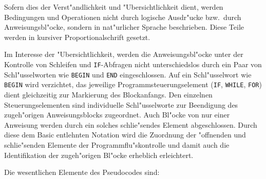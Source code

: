 Sofern dies der Verst"andlichkeit und "Ubersichtlichkeit
dient, werden Bedingungen und Operationen nicht durch logische
Ausdr"ucke bzw.\ durch Anweisungsbl"ocke, sondern in nat"urlicher
Sprache beschrieben. Diese Teile werden in kursiver Proportionalschrift
gesetzt.

Im Interesse der "Ubersichtlichkeit, werden die Anweisungsbl"ocke unter der Kontrolle
von Schleifen und \verb|IF|-Abfragen nicht unterschiedslos durch ein Paar von
Schl"usselworten wie \verb|BEGIN| und \verb|END| eingeschlossen. Auf ein Schl"usselwort
wie \verb|BEGIN| wird verzichtet, das jeweilige Programmsteuerungselement
(\verb|IF|, \verb|WHILE|, \verb|FOR|) dient gleichzeitig zur Markierung des
Blockanfangs. Den einzelnen Steuerungselementen sind individuelle Schl"usselworte
zur Beendigung des zugeh"origen Anweisungsblocks zugeordnet. Auch Bl"ocke von
nur einer Anweisung werden durch ein solches schlie"sendes Element abgeschlossen.
Durch diese dem Basic entlehnten Notation wird die Zuordnung der "offnenden
und schlie"senden Elemente der Programmflu"skontrolle und damit auch die
Identifikation der zugeh"origen Bl"ocke erheblich erleichtert.

Die wesentlichen Elemente des Pseudocodes sind:

